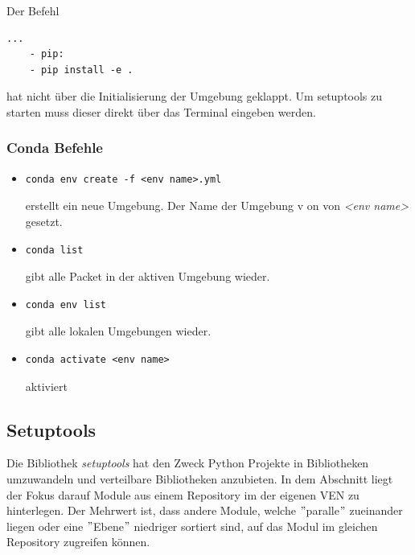 Der Befehl 
\begin{lstlisting}[style=Config, caption={Beispiel Nicht übergebener Befehl}, captionpos=b]
	...
	- pip:
	- pip install -e .
\end{lstlisting}

hat nicht über die Initialisierung der Umgebung geklappt. Um setuptools zu starten muss dieser direkt über das Terminal eingeben werden.


\subsubsection{Conda Befehle}
\begin{itemize}
	\item 
	\begin{lstlisting}[style=CMD]
		conda env create -f <env name>.yml
	\end{lstlisting}
	erstellt ein neue Umgebung. Der Name der Umgebung v on von \textit{<env name>} gesetzt. 
	\item 	\begin{lstlisting}[style=CMD]
		conda list
	\end{lstlisting} gibt alle Packet in der aktiven Umgebung wieder.
	\item 	\begin{lstlisting}[style=CMD]
		conda env list
	\end{lstlisting}  gibt alle lokalen Umgebungen wieder.
	\item 	\begin{lstlisting}[style=CMD]
		conda activate <env name>
	\end{lstlisting}  aktiviert
\end{itemize}

\subsection{Setuptools}
Die Bibliothek \textit{setuptools} hat den Zweck Python Projekte in Bibliotheken umzuwandeln und verteilbare Bibliotheken anzubieten. In dem Abschnitt liegt der Fokus darauf Module aus einem Repository im der eigenen \gls{VEN} zu hinterlegen. Der Mehrwert ist, dass andere Module, welche $"$paralle$"$ zueinander liegen oder eine $"$Ebene$"$ niedriger sortiert sind, auf das Modul im gleichen Repository zugreifen können. \\

